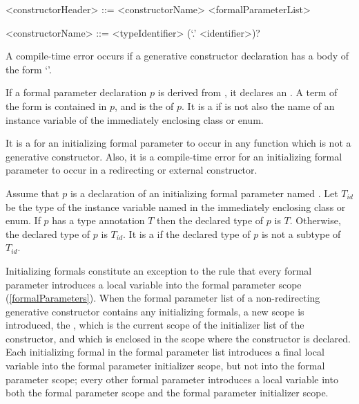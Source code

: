 \documentclass[makeidx]{article}
\begin{document}
\begin{grammar}
<constructorHeader> ::= <constructorName> <formalParameterList>

<constructorName> ::= <typeIdentifier> (`.' <identifier>)?
\end{grammar}


\LMHash{}%
A compile-time error occurs if a generative constructor declaration
has a body of the form `'.


\LMHash{}%
If a formal parameter declaration $p$ is derived from
,
it declares an .
A term of the form  is contained in $p$,
and \id{} is the  of $p$.
It is a  if \id{} is not also the name of
an instance variable of the immediately enclosing class or enum.

\LMHash{}%
It is a  for an initializing formal parameter
to occur in any function which is not a generative constructor.
Also, it is a compile-time error for an initializing formal parameter
to occur in a redirecting or external constructor.

\LMHash{}%
Assume that $p$ is a declaration of an initializing formal parameter named \id.
Let $T_{id}$ be the type of the instance variable named \id{} in
the immediately enclosing class or enum.
If $p$ has a type annotation $T$ then the declared type of $p$ is $T$.
Otherwise, the declared type of $p$ is $T_{id}$.
It is a  if the declared type of $p$
is not a subtype of $T_{id}$.

\LMHash{}%
Initializing formals constitute an exception to the rule that
every formal parameter introduces a local variable into
the formal parameter scope (\ref{formalParameters}).
When the formal parameter list of a non-redirecting generative constructor
contains any initializing formals, a new scope is introduced, the
,
which is the current scope of the initializer list of the constructor,
and which is enclosed in the scope where the constructor is declared.
Each initializing formal in the formal parameter list
introduces a final local variable into the formal parameter initializer scope,
but not into the formal parameter scope;
every other formal parameter introduces a local variable into
both the formal parameter scope and the formal parameter initializer scope.
\end{document}
